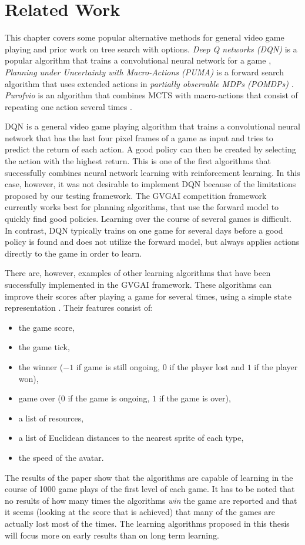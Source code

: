 \chapter{Related Work}
\label{sec:related}
This chapter covers some popular alternative methods for general video game
playing and prior work on tree search with options. \emph{Deep Q networks (DQN)}
is a popular algorithm that trains a convolutional neural network for a game
\cite{mnih2013playing}, \emph{Planning under Uncertainty with Macro-Actions
(PUMA)} is a forward search algorithm that uses extended actions in
\emph{partially observable MDPs (POMDPs)} \cite{he2010puma}.  \emph{Purofvio} is
an algorithm that combines MCTS with macro-actions that consist of repeating one
action several times \cite{powley2012monte}. 

DQN is a general video game playing algorithm that trains a convolutional neural
network that has the last four pixel frames of a game as input and tries to
predict the return of each action. A good policy can then be created by
selecting the action with the highest return. This is one of the first
algorithms that successfully combines neural network learning with reinforcement
learning. In this case, however, it was not desirable to implement DQN because
of the limitations proposed by our testing framework. The GVGAI competition
framework currently works best for planning algorithms, that use the forward
model to quickly find good policies. Learning over the course of several games
is difficult. In contrast, DQN typically trains on one game for several days
before a good policy is found and does not utilize the forward model, but always
applies actions directly to the game in order to learn.

There are, however, examples of other learning algorithms that have been successfully
implemented in the GVGAI framework. These 
algorithms can improve their scores after playing a game for several times,
using a simple state representation \cite{samothrakis2015neuroevolution}. Their
features consist of: 
\begin{itemize}%
	\item the game score, 
	\item the game tick,
	\item the winner ($-1$ if game is still ongoing, $0$ if the player lost and
		$1$ if the player won), 
	\item game over ($0$ if the game is ongoing, $1$ if the game is over), 
	\item a list of resources, 
	\item a list of Euclidean distances to the nearest sprite of each type,
	\item the speed of the avatar. 
\end{itemize}
The results of the paper show that the algorithms are capable of learning in the
course of 1000 game plays of the first level of each game. It has to be noted
that no results of how many times the algorithms \emph{win} the game are
reported and that it seems (looking at the score that is achieved) that many of
the games are actually lost most of the times. The learning algorithms proposed
in this thesis will focus more on early results than on long term learning.

